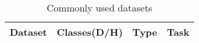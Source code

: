 \begin{table*}
\centering
\caption{Commonly used datasets}
\label{tab2}
	\begin{tabularx}{19cm}{X|X|X|X}
	\hline
Dataset                                                  & Classes(D/H)                                                                                                        & Type                & Task                       \\
\hline

\end{tabularx}
\end{table*}
